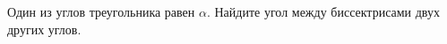 \begin{ex}
	\begin{condition}
		Один из углов треугольника равен \( \alpha \). Найдите угол между биссектрисами двух других углов.
	\end{condition}
\end{ex}